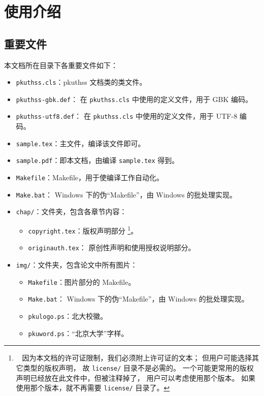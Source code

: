 \chapter{使用介绍}
	\section{重要文件}

	本文档所在目录下各重要文件如下：
	\begin{itemize}
		\item \verb|pkuthss.cls|：pkuthss 文档类的类文件。
		\item \verb|pkuthss-gbk.def|：
			在 \verb|pkuthss.cls| 中使用的定义文件，用于 GBK 编码。
		\item \verb|pkuthss-utf8.def|：
			在 \verb|pkuthss.cls| 中使用的定义文件，用于 UTF-8 编码。
		\item \verb|sample.tex|：主文件，编译该文件即可。
		\item \verb|sample.pdf|：即本文档，由编译 \verb|sample.tex| 得到。
		\item \verb|Makefile|：Makefile，用于使编译工作自动化。
		\item \verb|Make.bat|：%
			Windows 下的伪“Makefile”，由 Windows 的批处理实现。
		\item \verb|chap/|：文件夹，包含各章节内容：
		\begin{itemize}
			\item \verb|copyright.tex|：版权声明部分%
			\cite{pku-copyright}%
			\footnote
			{\ %
				因为本文档的许可证限制，我们必须附上许可证的文本；
				但用户可能选择其它类型的版权声明，
				故 \texttt{license/} 目录不是必需的。
				一个可能更常用的版权声明已经放在此文件中，但被注释掉了，
				用户可以考虑使用那个版本。
				如果使用那个版本，就不再需要 \texttt{license/} 目录了。
			}。
			\item \verb|originauth.tex|：
				原创性声明和使用授权说明部分\cite{pku-originauth}。
		\end{itemize}
		\item \verb|img/|：文件夹，包含论文中所有图片：
		\begin{itemize}
			\item \verb|Makefile|：图片部分的 Makefile。
			\item \verb|Make.bat|：%
				Windows 下的伪“Makefile”，由 Windows 的批处理实现。
			\item \verb|pkulogo.ps|：北大校徽。
			\item \verb|pkuword.ps|：“北京大学”字样。
		\end{itemize}
	\end{itemize}

